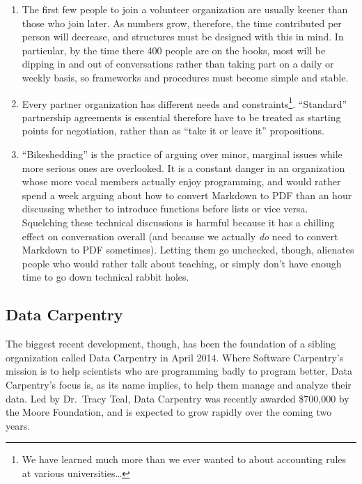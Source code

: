 \documentclass[10pt,a4paper,twocolumn]{article}
\begin{document}
\begin{enumerate}

\item
  The first few people to join a volunteer organization are usually
  keener than those who join later.  As numbers grow, therefore, the
  time contributed per person will decrease, and structures must be
  designed with this in mind.  In particular, by the time there 400
  people are on the books, most will be dipping in and out of
  conversations rather than taking part on a daily or weekly basis, so
  frameworks and procedures must become simple and stable.

\item
  Every partner organization has different needs and
  constraints\footnote{We have learned much more than we ever wanted
    to about accounting rules at various universities\ldots}.
  ``Standard'' partnership agreements is essential therefore have to
  be treated as starting points for negotiation, rather than as ``take
  it or leave it'' propositions.

\item
  ``Bikeshedding'' is the practice of arguing over minor, marginal
  issues while more serious ones are overlooked.  It is a constant
  danger in an organization whose more vocal members actually enjoy
  programming, and would rather spend a week arguing about how to
  convert Markdown to PDF than an hour discussing whether to introduce
  functions before lists or vice versa.  Squelching these technical
  discussions is harmful because it has a chilling effect on
  conversation overall (and because we actually \emph{do} need to
  convert Markdown to PDF sometimes).  Letting them go unchecked,
  though, alienates people who would rather talk about teaching, or
  simply don't have enough time to go down technical rabbit holes.

\end{enumerate}

\subsection*{Data Carpentry}

The biggest recent development, though, has been the foundation of a
sibling organization called Data Carpentry in April 2014.  Where
Software Carpentry's mission is to help scientists who are programming
badly to program better, Data Carpentry's focus is, as its name
implies, to help them manage and analyze their data.  Led by
Dr.\ Tracy Teal, Data Carpentry was recently awarded \$700,000 by the
Moore Foundation, and is expected to grow rapidly over the coming two
years.
\end{document}
